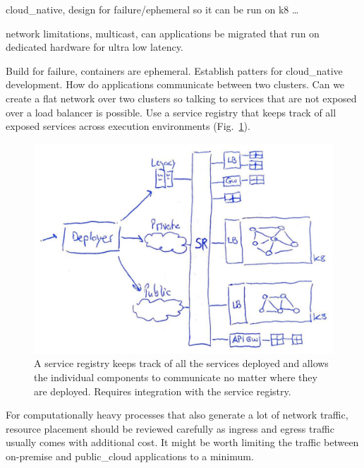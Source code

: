 \documentclass[../main.tex]{subfiles}
\begin{document}

    \gls{cloud_native}, design for failure/ephemeral so it can be run on k8 \ldots

    network limitations, multicast, can applications be migrated that run on dedicated hardware for ultra low latency.

    Build for failure, containers are ephemeral.
    Establish patters for \gls{cloud_native} development.
    How do applications communicate between two clusters.
    Can we create a flat network over two clusters so talking to services that are not exposed over a load balancer is possible.
    Use a service registry that keeps track of all exposed services across execution environments (Fig.~\ref{fig:deploy_svc_registry}).

    \begin{figure}[h]
        \centering
        \includegraphics[width=.8\linewidth]{img/abandoned_deploy_registry.jpg}
        \captionsetup{justification=centering}
        \caption{
            A service registry keeps track of all the services deployed and allows the individual components to communicate no matter where they are deployed.
            Requires integration with the service registry.
        }
        \label{fig:deploy_svc_registry}
    \end{figure}

    For computationally heavy processes that also generate a lot of network traffic, resource placement should be reviewed carefully as ingress and egress traffic usually comes with additional cost.
    It might be worth limiting the traffic between on-premise and \gls{public_cloud} applications to a minimum.
\end{document}
